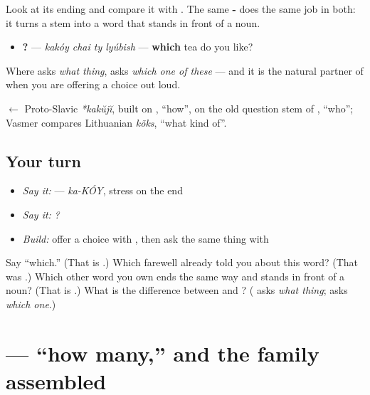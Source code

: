 Look at its ending and compare it with \textbf{}. The same \textbf{-} does the same job in both: it turns a stem into a word that stands in front of a noun.

\begin{itemize}
\raggedright
  \item \textbf{   ?} — \emph{kakóy chai ty lyúbish} — \textbf{which} tea do you like?
\end{itemize}

Where \textbf{} asks \emph{what thing}, \textbf{} asks \emph{which one of these} — and it is the natural partner of \textbf{} when you are offering a choice out loud.

\begin{cousinweb}
\textbf{} $\leftarrow$ Proto-Slavic \emph{*kakŭjĭ}, built on \emph{}, \textquotedblleft{}how\textquotedblright{}, on the old question stem of \emph{}, \textquotedblleft{}who\textquotedblright{}; Vasmer compares Lithuanian \emph{kõks}, \textquotedblleft{}what kind of\textquotedblright{}.
\end{cousinweb}

\subsection*{Your turn}
\begin{itemize}
\raggedright
  \item \emph{Say it:} \emph{} — \emph{ka-KÓY}, stress on the end
  \item \emph{Say it:} \emph{   ?}
  \item \emph{Build:} offer a choice with \textbf{}, then ask the same thing with \textbf{}
\end{itemize}

\begin{tcolorbox}[breakable,colback=teal!4,colframe=teal!35!black,title={Before you move on}]
Say \textquotedblleft{}which.\textquotedblright{} (That is \textbf{}.) Which farewell already told you about this word? (That was \textbf{}.) Which other word you own ends the same way and stands in front of a noun? (That is \textbf{}.) What is the difference between \textbf{} and \textbf{}? (\textbf{} asks \emph{what thing}; \textbf{} asks \emph{which one}.)
\end{tcolorbox}
\section[\texorpdfstring{\ru{сколько} (skólka)}{сколько (skólka)}]{ — \textquotedblleft{}how many,\textquotedblright{} and the family assembled}

